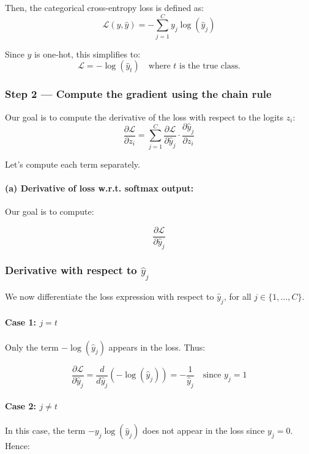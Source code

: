 \documentclass[11pt]{article}
\begin{document}
Then, the categorical cross-entropy loss is defined as:
\[
\mathcal{L}(y, \hat{y}) = -\sum_{j=1}^C y_j \log(\hat{y}_j)
\]

Since $y$ is one-hot, this simplifies to:
\[
\mathcal{L} = -\log(\hat{y}_t) \quad \text{where $t$ is the true class.}
\]

\subsubsection*{Step 2 — Compute the gradient using the chain rule}

Our goal is to compute the derivative of the loss with respect to the logits $z_i$:
\[
\frac{\partial \mathcal{L}}{\partial z_i}
= \sum_{j=1}^C \frac{\partial \mathcal{L}}{\partial \hat{y}_j} \cdot \frac{\partial \hat{y}_j}{\partial z_i}
\]

Let’s compute each term separately.

\paragraph{(a) Derivative of loss w.r.t. softmax output:}
Our goal is to compute:

\[
\frac{\partial \mathcal{L}}{\partial \hat{y}_j}
\]

\subsubsection*{Derivative with respect to \texorpdfstring{$\hat{y}_j$}{ŷj}}

We now differentiate the loss expression with respect to \(\hat{y}_j\), for all \(j \in \{1, \dots, C\}\).

\paragraph{Case 1: \texorpdfstring{$j = t$}{j = true class}}  
Only the term \(-\log(\hat{y}_j)\) appears in the loss. Thus:

\[
\frac{\partial \mathcal{L}}{\partial \hat{y}_j}
= \frac{d}{d \hat{y}_j} \left( -\log(\hat{y}_j) \right)
= -\frac{1}{\hat{y}_j}
\quad \text{since } y_j = 1
\]

\paragraph{Case 2: \texorpdfstring{$j \ne t$}{j ≠ true class}}  
In this case, the term \(-y_j \log(\hat{y}_j)\) does not appear in the loss since \(y_j = 0\). Hence:
\end{document}
